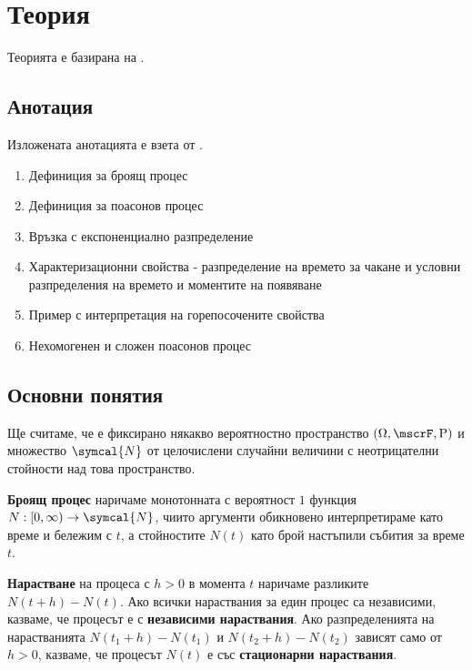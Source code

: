 \documentclass{../../common/topic}
\begin{document}
\maketitle

\section{Теория}

Теорията е базирана на \cite{Lectures}.

\subsection{Анотация}

Изложената анотацията е взета от \cite{Syllabus}.

\begin{enumerate}
  \item Дефиниция за броящ процес
  \item Дефиниция за поасонов процес
  \item Връзка с експоненциално разпределение
  \item Характеризационни свойства - разпределение на времето за чакане и условни разпределения на времето и моментите на появяване
  \item Пример с интерпретация на горепосочените свойства
  \item Нехомогенен и сложен поасонов процес
\end{enumerate}

\subsection{Основни понятия}

Ще считаме, че е фиксирано някакво вероятностно пространство \( (\Omega, \mscrF, \Prob) \) и множество \( \symcal{N} \) от целочислени случайни величини с неотрицателни стойности над това пространство.

\makeatletter
\setcounter{counters@theorem}{-1}
\makeatother
\begin{definition}
  \textbf{Броящ процес} наричаме монотонната с вероятност \( 1 \) функция \( N: [0, \infty) \to \symcal{N} \), чиито аргументи обикновено интерпретираме като време и бележим с \( t \), а стойностите \( N(t) \) като брой настъпили събития за време \( t \).

  \textbf{Нарастване} на процеса с \( h > 0 \) в момента \( t \) наричаме разликите \( N(t+h) - N(t) \). Ако всички нараствания за един процес са независими, казваме, че процесът е с \textbf{независими нараствания}. Ако разпределенията на нарастванията \( N(t_1+h) - N(t_1) \) и \( N(t_2+h) - N(t_2) \) зависят само от \( h>0 \), казваме, че процесът \( N(t) \) е със \textbf{стационарни нараствания}.
\end{definition}
\end{document}
